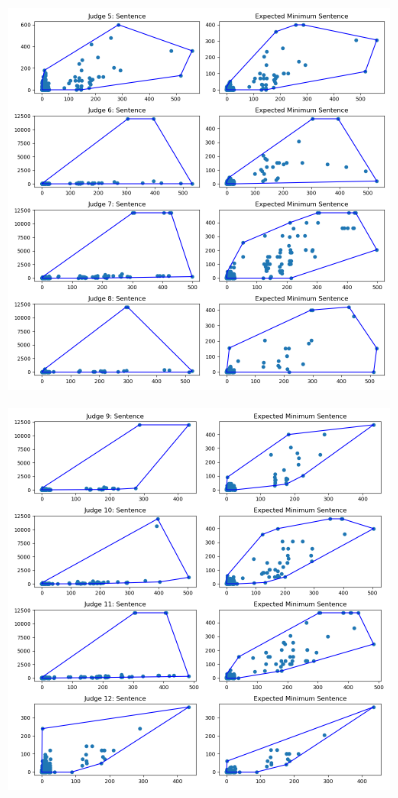 \documentclass[11pt]{article}
\begin{document}
  \begin{figure}[H]
    \centering
    \includegraphics[width=0.9\textwidth]{../../../output/figures/Exploration/judge_convex_hulls_1.png}
  \end{figure}

  \begin{figure}[H]
    \centering
    \includegraphics[width=0.9\textwidth]{../../../output/figures/Exploration/judge_convex_hulls_2.png}
  \end{figure}
\end{document}
